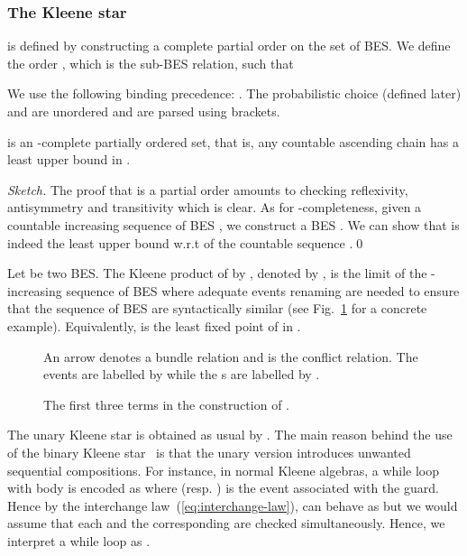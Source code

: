 \documentclass{llncs}
\newcommand{\<}{\langle}
\renewcommand{\>}{\rangle}
\begin{document}
\subsubsection{The Kleene star} is defined by constructing a complete partial order on the set of BES. We define the order , which is the sub-BES relation, such that 



We use the following binding precedence: . The probabilistic choice  (defined later) and  are unordered and are parsed using brackets.


\begin{proposition}\label{pro:omega-completeness}
 is an -complete partially ordered set, that is, any countable ascending chain has a least upper bound in .
\end{proposition}

\begin{proof}[Sketch]
The proof that  is a partial order amounts to checking reflexivity, antisymmetry and transitivity which is clear. As for -completeness, given a countable increasing sequence of BES , we construct a BES . We can show that  is indeed the least upper bound w.r.t  of the countable sequence .\qed
\end{proof}

Let  be two BES. The Kleene product of  by , denoted by , is the limit of the -increasing sequence of BES 
where adequate events renaming are needed to ensure that the sequence of BES are syntactically similar (see Fig.~\ref{fig:kleene-series} for a concrete example). Equivalently,  is the least fixed point of  in .
\begin{figure}
\begin{tiny}
\end{tiny}
An arrow  denotes a bundle relation and  is the conflict relation. The events  are labelled by  while the s are labelled by .
\caption{The first three terms in the construction of .}\label{fig:kleene-series}
\end{figure} 
The unary Kleene star is obtained as usual by . The main reason behind the use of the binary Kleene star~\cite{Fok94} is that the unary version introduces unwanted sequential compositions. For instance, in normal Kleene algebras, a while loop with body  is encoded as  where  (resp. ) is the event associated with the guard. Hence by the interchange law~(\ref{eq:interchange-law}),  can behave as  but we would assume that each  and the corresponding  are checked simultaneously. Hence, we interpret a while loop as .
\end{document}
